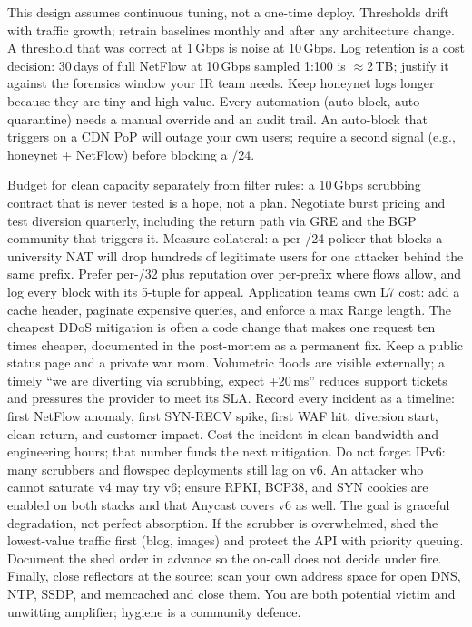\begin{remark}\label{rem:opnote}
This design assumes continuous tuning, not a one-time deploy. Thresholds drift with traffic growth; retrain baselines monthly and after any architecture change. A threshold that was correct at 1\,Gbps is noise at 10\,Gbps.
Log retention is a cost decision: 30\,days of full NetFlow at 10\,Gbps sampled 1:100 is $\approx$2\,TB; justify it against the forensics window your IR team needs. Keep honeynet logs longer because they are tiny and high value.
Every automation (auto-block, auto-quarantine) needs a manual override and an audit trail. An auto-block that triggers on a CDN PoP will outage your own users; require a second signal (e.g., honeynet + NetFlow) before blocking a /24.
\end{remark}
Budget for clean capacity separately from filter rules: a 10\,Gbps scrubbing contract that is never tested is a hope, not a plan. Negotiate burst pricing and test diversion quarterly, including the return path via GRE and the BGP community that triggers it.
Measure collateral: a per-/24 policer that blocks a university NAT will drop hundreds of legitimate users for one attacker behind the same prefix. Prefer per-/32 plus reputation over per-prefix where flows allow, and log every block with its 5-tuple for appeal.
Application teams own L7 cost: add a cache header, paginate expensive queries, and enforce a max Range length. The cheapest DDoS mitigation is often a code change that makes one request ten times cheaper, documented in the post-mortem as a permanent fix.
Keep a public status page and a private war room. Volumetric floods are visible externally; a timely ``we are diverting via scrubbing, expect +20\,ms'' reduces support tickets and pressures the provider to meet its SLA.
Record every incident as a timeline: first NetFlow anomaly, first SYN-RECV spike, first WAF hit, diversion start, clean return, and customer impact. Cost the incident in clean bandwidth and engineering hours; that number funds the next mitigation.
Do not forget IPv6: many scrubbers and flowspec deployments still lag on v6. An attacker who cannot saturate v4 may try v6; ensure RPKI, BCP38, and SYN cookies are enabled on both stacks and that Anycast covers v6 as well.
The goal is graceful degradation, not perfect absorption. If the scrubber is overwhelmed, shed the lowest-value traffic first (blog, images) and protect the API with priority queuing. Document the shed order in advance so the on-call does not decide under fire.
Finally, close reflectors at the source: scan your own address space for open DNS, NTP, SSDP, and memcached and close them. You are both potential victim and unwitting amplifier; hygiene is a community defence.
